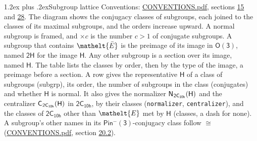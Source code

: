\documentclass[10pt,a4paper]{article}
\makeatletter
\renewcommand\section{\@startsection{section}{1}{\z@}{-3ex plus -1ex minus -.2ex}%
  {1.2ex plus .2ex}{\normalfont\large\sffamily\bfseries\color{parttitle}}}
\numberwithin{equation}{section}
\newcommand{\eltfont}[1]{{\let\sigma\eltsigma\mathelt{#1}}}
\newcommand{\grp}[1]{\mathsf{#1}}
\newcommand{\cls}[1]{\eltfont{#1}}
\newcommand{\elt}[1]{\eltfont{#1}}
\newcommand{\samecls}{\cong}
\newcommand{\barred}[1]{\bar{#1}}
\newcommand{\hairsp}{\mkern1mu}
\makeatother
\begin{document}
\section{Subgroup lattice}\label{s:subgroups}
Conventions: \href{../../CONVENTIONS.pdf}{CONVENTIONS.pdf}, sections \href{../../../rotation/CONVENTIONS.pdf\#conv.15}{15} and \href{../../CONVENTIONS.pdf\#conv.28}{28}.
The diagram shows the conjugacy classes of subgroups, each joined to the classes of its maximal subgroups, and the orders increase upward. \label{n:index.conjugates.c}A normal subgroup is framed, and ${\times}c$ is the number $c > 1$ of conjugate subgroups. \label{n:group.H}A subgroup that contains $\elt{\barred{E}}$ is the preimage of its image in $\grp{O(3)}$, named $\grp{2H}$ for the image $\grp{H}$. Any other subgroup is a section over its image, named $\grp{H}$. The table lists the classes by order, then by the type of the image, a preimage before a section. \label{n:head.subgroup}\label{n:head.order}\label{n:head.conjugates}\label{n:head.normal}A row gives the representative $\grp{H}$ of a class of subgroups (subgrp), its order, the number of subgroups in the class (conjugates) and whether $\grp{H}$ is normal. \label{n:group.normalizer}\label{n:group.centralizer}\label{n:head.classes}It also gives the normalizer $\grp{N}_{\hairsp \grp{2C_{10h}}}(\grp{H})$ and the centralizer $\grp{C}_{\hairsp \grp{2C_{10h}}}(\grp{H})$ in $\grp{2C_{10h}}$, by their classes (\texttt{normalizer}, \texttt{centralizer}), and the classes of $\grp{2C_{10h}}$ other than $\cls{E}$ met by $\grp{H}$ (classes, a dash for none). A subgroup's other names in its \href{Pinminus3.pdf}{$\grp{Pin^{-}(3)}$}-conjugacy class follow $\samecls$ (\href{../../CONVENTIONS.pdf}{CONVENTIONS.pdf}, section \href{../../CONVENTIONS.pdf\#conv.20.2}{20.2}).
\end{document}
